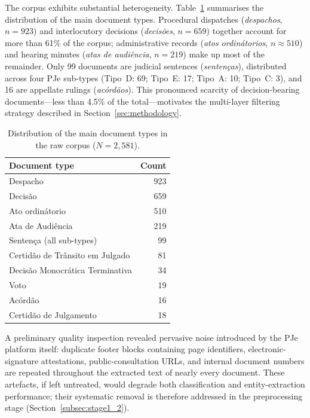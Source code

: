 \documentclass[preprint,a4paper,fleqn]{cas-dc}
\begin{document}
The corpus exhibits substantial heterogeneity. Table~\ref{tab:doc_types} summarises the distribution of the main document types. Procedural dispatches (\textit{despachos}, $n=923$) and interlocutory decisions (\textit{decis\~oes}, $n=659$) together account for more than 61\% of the corpus; administrative records (\textit{atos ordin\'atorios}, $n\approx510$) and hearing minutes (\textit{atas de audi\^encia}, $n=219$) make up most of the remainder. Only 99 documents are judicial sentences (\textit{senten\c{c}as}), distributed across four PJe sub-types (Tipo~D: 69; Tipo~E: 17; Tipo~A: 10; Tipo~C: 3), and 16 are appellate rulings (\textit{ac\'ord\~aos}). This pronounced scarcity of decision-bearing documents---less than 4.5\% of the total---motivates the multi-layer filtering strategy described in Section~\ref{sec:methodology}.

\begin{table}[t]
\centering
\caption{Distribution of the main document types in the raw corpus ($N=2{,}581$).}
\label{tab:doc_types}
\begin{tabular}{lr}
\toprule
\textbf{Document type} & \textbf{Count} \\
\midrule
Despacho                        & 923 \\
Decis\~ao                       & 659 \\
Ato ordin\'atorio               & 510 \\
Ata de Audi\^encia              & 219 \\
Senten\c{c}a (all sub-types)    &  99 \\
Certid\~ao de Tr\^ansito em Julgado & 81 \\
Decis\~ao Monocr\'atica Terminativa & 34 \\
Voto                            &  19 \\
Ac\'ord\~ao                     &  16 \\
Certid\~ao de Julgamento        &  18 \\
\bottomrule
\end{tabular}
\end{table}

A preliminary quality inspection revealed pervasive noise introduced by the PJe platform itself: duplicate footer blocks containing page identifiers, electronic-signature attestations, public-consultation URLs, and internal document numbers are repeated throughout the extracted text of nearly every document. These artefacts, if left untreated, would degrade both classification and entity-extraction performance; their systematic removal is therefore addressed in the preprocessing stage (Section~\ref{subsec:stage1_2}).
\end{document}
